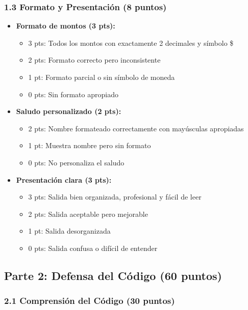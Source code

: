 \documentclass[12pt,a4paper]{article}
\begin{document}
\subsubsection{1.3 Formato y Presentación (8 puntos)}

\begin{itemize}[leftmargin=*]
    \item \textbf{Formato de montos (3 pts):}
    \begin{itemize}
        \item 3 pts: Todos los montos con exactamente 2 decimales y símbolo \$
        \item 2 pts: Formato correcto pero inconsistente
        \item 1 pt: Formato parcial o sin símbolo de moneda
        \item 0 pts: Sin formato apropiado
    \end{itemize}
    
    \item \textbf{Saludo personalizado (2 pts):}
    \begin{itemize}
        \item 2 pts: Nombre formateado correctamente con mayúsculas apropiadas
        \item 1 pt: Muestra nombre pero sin formato
        \item 0 pts: No personaliza el saludo
    \end{itemize}
    
    \item \textbf{Presentación clara (3 pts):}
    \begin{itemize}
        \item 3 pts: Salida bien organizada, profesional y fácil de leer
        \item 2 pts: Salida aceptable pero mejorable
        \item 1 pt: Salida desorganizada
        \item 0 pts: Salida confusa o difícil de entender
    \end{itemize}
\end{itemize}

\subsection{Parte 2: Defensa del Código (60 puntos)}

\subsubsection{2.1 Comprensión del Código (30 puntos)}
\end{document}
